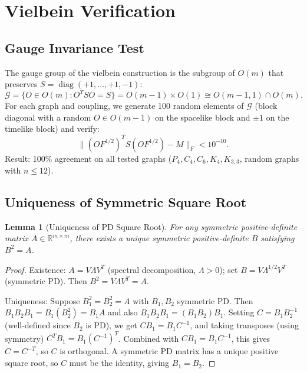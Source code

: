 \documentclass[11pt]{article}
\newtheorem{lemma}[theorem]{Lemma}
\theoremstyle{definition}
\theoremstyle{remark}
\newcommand{\Fish}{F}
\newcommand{\sgn}{S}
\newcommand{\Met}{M}
\newcommand{\diag}{\operatorname{diag}}
\begin{document}
\section{Vielbein Verification}
\label{app:vielbein}

\subsection{Gauge Invariance Test}

The gauge group of the vielbein construction is the subgroup of $O(m)$
that preserves $\sgn = \diag(+1,\ldots,+1,-1)$:
\begin{equation}
  \mathcal{G} = \{O \in O(m) : O^T \sgn O = \sgn\}
    = O(m-1) \times O(1) \cong O(m-1,1) \cap O(m).
\end{equation}
For each graph and coupling, we generate 100 random elements of
$\mathcal{G}$ (block diagonal with a random $O \in O(m-1)$ on the
spacelike block and $\pm 1$ on the timelike block) and verify:
\begin{equation}
  \|(O\Fish^{1/2})^T \sgn (O\Fish^{1/2}) - \Met\|_F < 10^{-10}.
  \label{eq:gauge-test}
\end{equation}
Result: 100\% agreement on all tested graphs
($P_4, C_4, C_6, K_4, K_{3,3}$, random graphs with $n \leq 12$).

\subsection{Uniqueness of Symmetric Square Root}

\begin{lemma}[Uniqueness of PD Square Root]
\label{lem:sqrt-unique}
For any symmetric positive-definite matrix $A \in \mathbb{R}^{m \times m}$,
there exists a unique symmetric positive-definite $B$ satisfying $B^2 = A$.
\end{lemma}

\begin{proof}
Existence: $A = V\Lambda V^T$ (spectral decomposition, $\Lambda > 0$);
set $B = V\Lambda^{1/2}V^T$ (symmetric PD). Then $B^2 = V\Lambda V^T = A$.

Uniqueness: Suppose $B_1^2 = B_2^2 = A$ with $B_1, B_2$ symmetric PD.
Then $B_1 B_2 B_1 = B_1 (B_2^2) = B_1 A$ and also $B_1 B_2 B_1
= (B_1 B_2) B_1$. Setting $C = B_1 B_2^{-1}$ (well-defined since
$B_2$ is PD), we get $C B_1 = B_1 C^{-1}$, and taking transposes
(using symmetry) $C^T B_1 = B_1 (C^{-1})^T$. Combined with
$CB_1 = B_1 C^{-1}$, this gives $C = C^{-T}$, so $C$ is orthogonal.
A symmetric PD matrix has a unique positive square root, so $C$ must
be the identity, giving $B_1 = B_2$.
\end{proof}
\end{document}

